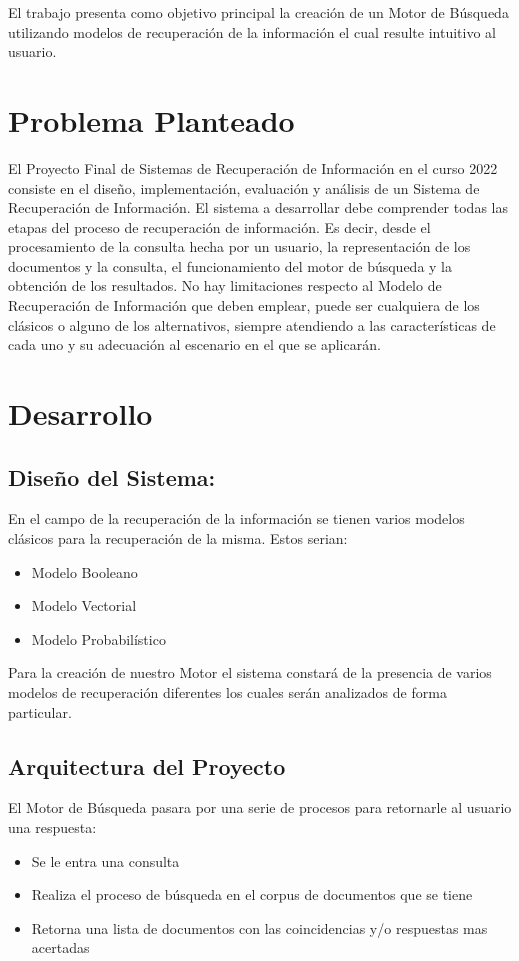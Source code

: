 \documentclass[runningheads]{llncs}
\begin{document}
El trabajo presenta como objetivo principal la creación de un Motor de Búsqueda utilizando modelos de recuperación de la información el cual resulte intuitivo al usuario.


\section*{Problema Planteado}
El Proyecto Final de Sistemas de Recuperación de Información en el curso 2022 consiste en el diseño, implementación, evaluación y análisis de un Sistema de Recuperación de Información. El sistema a desarrollar debe comprender todas las etapas del proceso de recuperación de información. Es decir, desde el procesamiento de la consulta hecha por un usuario, la representación de los documentos y la consulta, el funcionamiento del motor de búsqueda y la obtención de los resultados. No hay limitaciones respecto al Modelo de Recuperación de Información que deben emplear, puede ser cualquiera de los clásicos o alguno de los alternativos, siempre atendiendo a las características de cada uno y su adecuación al escenario en el que se aplicarán.

\section*{Desarrollo}
\subsection*{Diseño del Sistema:}
En el campo de la recuperación de la información se tienen varios modelos clásicos para la recuperación de la misma. Estos serian:
\begin{itemize}
	\item Modelo Booleano
	\item Modelo Vectorial
	\item Modelo Probabilístico
\end{itemize}
Para la creación de nuestro Motor el sistema constará de la presencia de varios modelos de recuperación diferentes los cuales serán analizados de forma particular.

\subsection*{Arquitectura del Proyecto}
El Motor de Búsqueda pasara por una serie de procesos para retornarle al usuario una respuesta:
\begin{itemize}
	\item Se le entra una consulta
	\item Realiza el proceso de búsqueda en el corpus de documentos que se tiene
	\item Retorna una lista de documentos con las coincidencias y/o respuestas mas acertadas 
\end{itemize}
\end{document}
